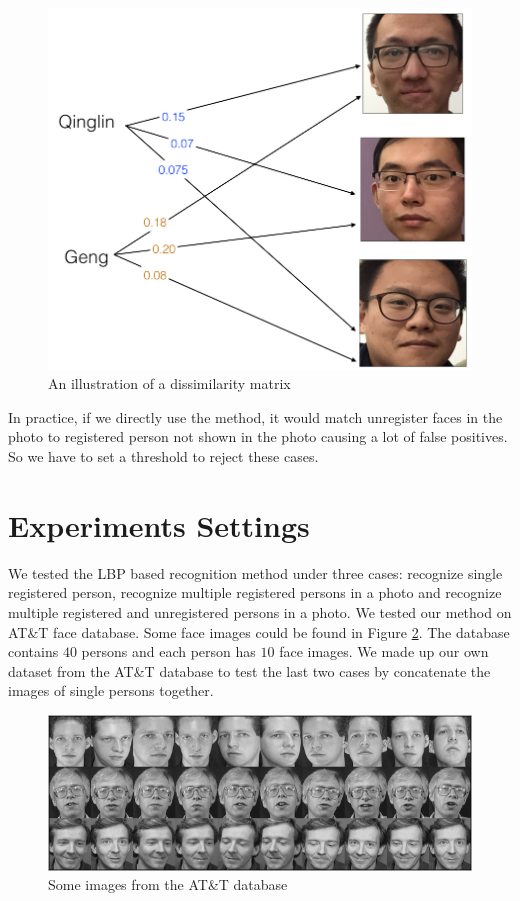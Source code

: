 \documentclass[paper=a4, fontsize=11pt]{scrartcl} %
\numberwithin{equation}{section} %
\numberwithin{figure}{section} %
\numberwithin{table}{section} %
\begin{document}
\begin{figure}[!htbp]
	\centering
	\includegraphics[width=6in]{disimilarity.jpg}
	\caption{An illustration of a dissimilarity matrix}
	\label{fig:disimilarity}
\end{figure}

In practice, if we directly use the method, it would match unregister faces in the photo to registered person not shown in the photo causing a lot of false positives. So we have to set a threshold to reject these cases.

\section{Experiments Settings}
We tested the LBP based recognition method under three cases: recognize single registered person, recognize multiple registered persons in a photo and recognize multiple registered and unregistered persons in a photo. We tested our method on AT\&T face database\cite{Samaria1995Parameterisation}. Some face images could be found in Figure \ref{fig:att_faces}. The database contains $40$ persons and each person has $10$ face images. We made up our own dataset from the AT\&T database to test the last two cases by concatenate the images of single persons together.

\begin{figure}[!htbp]
	\centering
	\includegraphics[width=6in]{att_faces.png}
	\caption{Some images from the AT\&T database}
	\label{fig:att_faces}
\end{figure}
\end{document}

